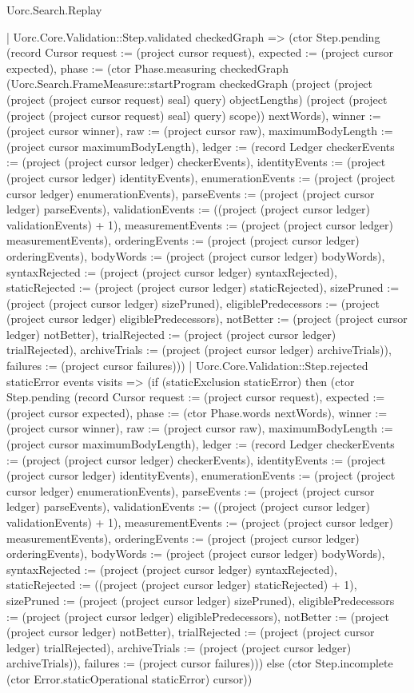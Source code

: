 \begin{lexlean}{Uorc.Search.Replay}
\begin{semanticmodule}
{      | Uorc.Core.Validation::Step.validated checkedGraph => (ctor Step.pending (record Cursor {request := (project cursor request), expected := (project cursor expected), phase := (ctor Phase.measuring checkedGraph (Uorc.Search.FrameMeasure::startProgram checkedGraph (project (project (project (project cursor request) seal) query) objectLengths) (project (project (project (project cursor request) seal) query) scope)) nextWords), winner := (project cursor winner), raw := (project cursor raw), maximumBodyLength := (project cursor maximumBodyLength), ledger := (record Ledger {checkerEvents := (project (project cursor ledger) checkerEvents), identityEvents := (project (project cursor ledger) identityEvents), enumerationEvents := (project (project cursor ledger) enumerationEvents), parseEvents := (project (project cursor ledger) parseEvents), validationEvents := ((project (project cursor ledger) validationEvents) + 1), measurementEvents := (project (project cursor ledger) measurementEvents), orderingEvents := (project (project cursor ledger) orderingEvents), bodyWords := (project (project cursor ledger) bodyWords), syntaxRejected := (project (project cursor ledger) syntaxRejected), staticRejected := (project (project cursor ledger) staticRejected), sizePruned := (project (project cursor ledger) sizePruned), eligiblePredecessors := (project (project cursor ledger) eligiblePredecessors), notBetter := (project (project cursor ledger) notBetter), trialRejected := (project (project cursor ledger) trialRejected), archiveTrials := (project (project cursor ledger) archiveTrials)}), failures := (project cursor failures)}))
      | Uorc.Core.Validation::Step.rejected staticError events visits => (if (staticExclusion staticError) then (ctor Step.pending (record Cursor {request := (project cursor request), expected := (project cursor expected), phase := (ctor Phase.words nextWords), winner := (project cursor winner), raw := (project cursor raw), maximumBodyLength := (project cursor maximumBodyLength), ledger := (record Ledger {checkerEvents := (project (project cursor ledger) checkerEvents), identityEvents := (project (project cursor ledger) identityEvents), enumerationEvents := (project (project cursor ledger) enumerationEvents), parseEvents := (project (project cursor ledger) parseEvents), validationEvents := ((project (project cursor ledger) validationEvents) + 1), measurementEvents := (project (project cursor ledger) measurementEvents), orderingEvents := (project (project cursor ledger) orderingEvents), bodyWords := (project (project cursor ledger) bodyWords), syntaxRejected := (project (project cursor ledger) syntaxRejected), staticRejected := ((project (project cursor ledger) staticRejected) + 1), sizePruned := (project (project cursor ledger) sizePruned), eligiblePredecessors := (project (project cursor ledger) eligiblePredecessors), notBetter := (project (project cursor ledger) notBetter), trialRejected := (project (project cursor ledger) trialRejected), archiveTrials := (project (project cursor ledger) archiveTrials)}), failures := (project cursor failures)})) else (ctor Step.incomplete (ctor Error.staticOperational staticError) cursor))
}
\end{semanticmodule}
\end{lexlean}
